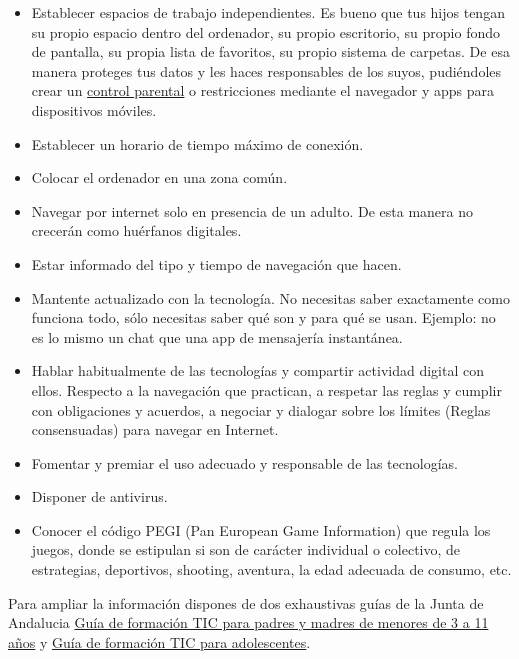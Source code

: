 \documentclass[
  spanish,
  a4paper,
  openany]{book}
\begin{document}
\begin{itemize}
\item
  Establecer espacios de trabajo independientes. Es bueno que tus hijos tengan su propio espacio dentro del ordenador, su propio escritorio, su propio fondo de pantalla, su propia lista de favoritos, su propio sistema de carpetas. De esa manera proteges tus datos y les haces responsables de los suyos, pudiéndoles crear un \href{https://securekids.es/que-es-el-control-parental-y-para-que-sirve/}{control parental} o restricciones mediante el navegador y apps para dispositivos móviles.
\item
  Establecer un horario de tiempo máximo de conexión.
\item
  Colocar el ordenador en una zona común.
\item
  Navegar por internet solo en presencia de un adulto. De esta manera no crecerán como huérfanos digitales.
\item
  Estar informado del tipo y tiempo de navegación que hacen.
\item
  Mantente actualizado con la tecnología. No necesitas saber exactamente como funciona todo, sólo necesitas saber qué son y para qué se usan. Ejemplo: no es lo mismo un chat que una app de mensajería instantánea.
\item
  Hablar habitualmente de las tecnologías y compartir actividad digital con ellos. Respecto a la navegación que practican, a respetar las reglas y cumplir con obligaciones y acuerdos, a negociar y dialogar sobre los límites (Reglas consensuadas) para navegar en Internet.
\item
  Fomentar y premiar el uso adecuado y responsable de las tecnologías.
\item
  Disponer de antivirus.
\item
  Conocer el código PEGI (Pan European Game Information) que regula los juegos, donde se estipulan si son de carácter individual o colectivo, de estrategias, deportivos, shooting, aventura, la edad adecuada de consumo, etc.
\end{itemize}

Para ampliar la información dispones de dos exhaustivas guías de la Junta de Andalucia \href{https://www.andaluciaesdigital.es/documents/20182/28716/Educar+para+Proteger+-+Guía+resumida+de+formación+TIC+para+padres+y+madres+de+niños+de+3+a+11+años.pdf}{Guía de formación TIC para padres y madres de menores de 3 a 11 años} y \href{https://www.juntadeandalucia.es/educacion/portalaverroes/documents/10306/1673096/Educar_para_proteger_Guia_Adolescentes.pdf}{Guía de formación TIC para adolescentes}.
\end{document}

